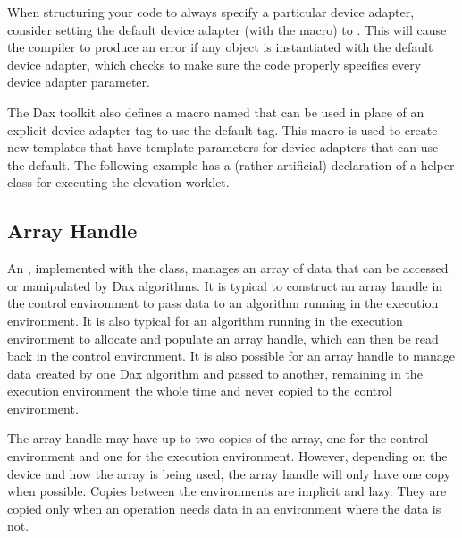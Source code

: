 When structuring your code to always specify a particular device adapter,
consider setting the default device adapter (with the
 macro) to
. This will cause the compiler to
produce an error if any object is instantiated with the default device
adapter, which checks to make sure the code properly specifies every device
adapter parameter.

The Dax toolkit also defines a macro named
 that can be used in place of
an explicit device adapter tag to use the default tag. This macro is used
to create new templates that have template parameters for device adapters
that can use the default. The following example has a (rather artificial)
declaration of a helper class for executing the elevation worklet.
\begin{daxexample}{Declaring a template with a default device adapter.}
template<typename DeviceAdapter = DAX_DEFAULT_DEVICE_ADAPTER_TAG>
class MyElevationScheduler
{
public:
  void DoSchedule()
  {
    dax::cont::Scheduler<DeviceAdapter> scheduler;
    scheduler.Invoke(dax::Worklet::Elevation(),
                     this->Grid.GetPointCoordinates(),
                     this->OutPointElevation);
\end{daxexample}


\subsection{Array Handle}
\label{sec:ArrayHandle}


An , implemented with the 
class, manages an array of data that can be accessed or manipulated by Dax
algorithms. It is typical to construct an array handle in the control
environment to pass data to an algorithm running in the execution
environment. It is also typical for an algorithm running in the execution
environment to allocate and populate an array handle, which can then be
read back in the control environment. It is also possible for an array
handle to manage data created by one Dax algorithm and passed to another,
remaining in the execution environment the whole time and never copied to
the control environment.

The array handle may have up to two copies of the array, one for the
control environment and one for the execution environment. However,
depending on the device and how the array is being used, the array handle
will only have one copy when possible. Copies between the environments are
implicit and lazy. They are copied only when an operation needs data in an
environment where the data is not.

